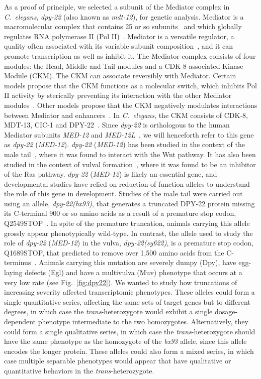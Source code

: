 \documentclass[10pt, twocolumn]{article}
\newcommand{\cel}{\emph{C.~elegans}}
\newcommand{\gene}[1]{\mbox{\emph{#1}}}
\newcommand{\protein}[1]{\mbox{\uppercase{#1}}}
\newcommand{\dpy}{\gene{dpy-22} (\emph{MED-12})}
\begin{document}
As a proof of principle, we selected a subunit of the Mediator complex in
\cel{}, \gene{dpy-22} (also known as \gene{mdt-12}), for genetic analysis.
Mediator is a macromolecular complex that contains 25 or so
subunits~\cite{Jeronimo2017} and which globally regulates RNA polymerase II (Pol
II)~\cite{Allen2015,Takagi2006}. Mediator is a versatile regulator, a quality
often associated with its variable subunit composition~\cite{Allen2015}, and it
can promote transcription as well as inhibit it. The Mediator complex consists
of four modules: the Head, Middle and Tail modules and a CDK-8-associated
Kinase Module (CKM). The CKM
can associate reversibly with Mediator. Certain models propose that the CKM
functions as a molecular switch, which inhibits Pol II activity by sterically
preventing its interaction with the other Mediator
modules~\cite{Knuesel2009,Elmlund2006}. Other models propose that the CKM
negatively modulates interactions between Mediator and
enhancers~\cite{VandePeppel2005}. In \cel{}, the CKM
consists of \protein{cdk-8}, \protein{mdt-13}, \protein{cic-1} and
\protein{DPY-22}~\cite{Grants2015}. Since \gene{dpy-22} is orthologous
to the human Mediator subunits \gene{MED-12} and \gene{MED-12L}~\cite{Zhang2000},
we will henceforth refer to this gene as \dpy{}.
\dpy{} has been studied in the context of the male tail~\cite{Zhang2000}, where
it was found to interact with the Wnt pathway. It has also been studied in
the context of vulval formation~\cite{Moghal2003a}, where it was found to be an
inhibitor of the Ras pathway. \dpy{} is likely an essential gene, and
developmental studies have relied on reduction-of-function alleles to understand
the role of this gene in development. Studies of the male tail were carried out
using an allele, \gene{dpy-22(bx93)}, that generates a truncated
\protein{dpy-22} protein missing its C-terminal 900 or so amino
acids as a result of a premature stop codon, Q2549STOP~\cite{Zhang2000}. In
spite of the premature truncation, animals carrying this allele grossly appear
phenotypically wild-type. In contrast, the allele used to study the role of
\dpy{} in the vulva, \gene{dpy-22(sy622)}, is a premature stop codon, Q1689STOP,
that predicted to remove over 1,500 amino acids from the
C-terminus~\cite{Moghal2003}. Animals carrying this mutation are severely dumpy
(Dpy), have egg-laying defects (Egl) and have a multivulva (Muv) phenotype that
occurs at a very low rate (see Fig.~\ref{fig:dpy22}). We wanted to study how
truncations of increasing severity affected transcriptomic phenotypes. These
alleles could form a single quantitative series, affecting the same sets of
target genes but to different degrees, in which case the
\emph{trans}-heterozygote would exhibit a single dosage-dependent phenotype
intermediate to the two homozygotes. Alternatively, they could form a single
qualitative series, in which case the \emph{trans}-heterozygote should have the same
phenotype as the homozygote of the \emph{bx93} allele, since this allele encodes
the longer protein. These alleles could also form a mixed series, in
which case multiple separable phenotypes would appear that have qualitative or
quantitative behaviors in the \emph{trans}-heterozygote.
\end{document}
